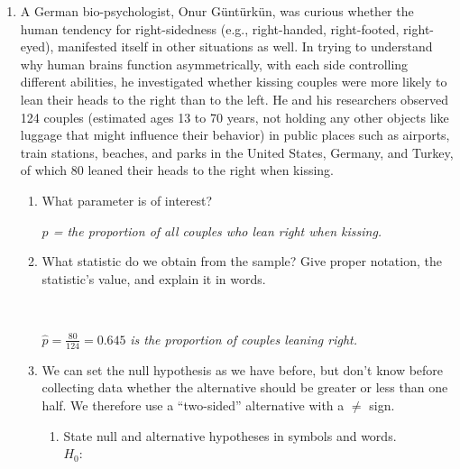 \begin{enumerate}
\item A German bio-psychologist, Onur G\"{u}nt\"{u}rk\"{u}n, was
  curious whether the human tendency for right-sidedness (e.g.,
  right-handed, right-footed, right-eyed), manifested itself in other
  situations as well. In trying to understand why human brains
  function asymmetrically, with each side controlling different
  abilities, he investigated whether kissing couples were more likely
  to lean their heads to the right than to the left.  He and his
  researchers observed 124 couples (estimated ages 13 to 70 years, not
  holding any other objects like luggage that might influence their
  behavior) in public places such as airports, train stations,
  beaches, and parks in the United States, Germany, and Turkey, of
  which 80 leaned their heads to the right when kissing.
  \begin{enumerate}
    \item  What parameter is of interest?
\begin{students}
    \vspace{1.4cm}    
\end{students}
\begin{key} 
  {\it $p$ = the proportion of all couples who lean right when kissing.}
\end{key}
  \item \label{kiss.phat} What statistic do we obtain from the sample?
    Give proper notation, the statistic's value, and explain it in words.
\begin{students}
    \vspace{2cm}    \\
\end{students}
\begin{key} 
   { $\widehat{p} = \frac{80}{124} = 0.645$ \it is the
    proportion of couples leaning right.}
\end{key}
\item We can set the null hypothesis as we have before, but don't know
  before collecting data whether the alternative should be greater or
  less than one half. We therefore use a ``two-sided'' alternative
  with a $\neq$ sign.
    \begin{enumerate}
    \item State null and alternative hypotheses in symbols and
      words.\\
      $H_0:$ 
\begin{students}
    \vspace{1.5cm}    \\
\end{students}

\end{enumerate}
\end{enumerate}
\end{enumerate}
